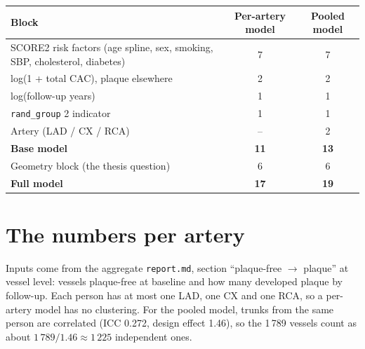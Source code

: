 \documentclass[11pt,a4paper]{article}
\begin{document}
\begin{center}
\begin{tabular}{>{\raggedright\arraybackslash}p{9.6cm}cc}
\toprule
Block & Per-artery model & Pooled model \\
\midrule
SCORE2 risk factors (age spline, sex, smoking, SBP, cholesterol, diabetes) & 7 & 7 \\
log(1 + total CAC), plaque elsewhere                                                   & 2 & 2 \\
log(follow-up years)                                                                   & 1 & 1 \\
\texttt{rand\_group} 2 indicator                                                       & 1 & 1 \\
Artery (LAD / CX / RCA)                                                                & -- & 2 \\
\midrule
\textbf{Base model}                                                                    & \textbf{11} & \textbf{13} \\
Geometry block (the thesis question)                                                   & 6 & 6 \\
\midrule
\textbf{Full model}                                                                    & \textbf{17} & \textbf{19} \\
\bottomrule
\end{tabular}
\end{center}

\section{The numbers per artery}

Inputs come from the aggregate \texttt{report.md}, section ``plaque-free $\to$ plaque'' at vessel
level: vessels plaque-free at baseline and how many developed plaque by follow-up. Each person has
at most one LAD, one CX and one RCA, so a per-artery model has no clustering. For the pooled model,
trunks from the same person are correlated (ICC 0.272, design effect 1.46), so the 1\,789 vessels
count as about $1\,789/1.46 \approx 1\,225$ independent ones.
\end{document}
